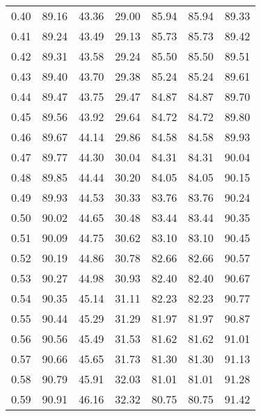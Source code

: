 \begin{tabular}{|c|c|c|c|c|c|c|}
      0.40 &     89.16 &     43.36 &      29.00 &   85.94 &      85.94 &         89.33 \\
      0.41 &     89.24 &     43.49 &      29.13 &   85.73 &      85.73 &         89.42 \\
      0.42 &     89.31 &     43.58 &      29.24 &   85.50 &      85.50 &         89.51 \\
      0.43 &     89.40 &     43.70 &      29.38 &   85.24 &      85.24 &         89.61 \\
      0.44 &     89.47 &     43.75 &      29.47 &   84.87 &      84.87 &         89.70 \\
      0.45 &     89.56 &     43.92 &      29.64 &   84.72 &      84.72 &         89.80 \\
      0.46 &     89.67 &     44.14 &      29.86 &   84.58 &      84.58 &         89.93 \\
      0.47 &     89.77 &     44.30 &      30.04 &   84.31 &      84.31 &         90.04 \\
      0.48 &     89.85 &     44.44 &      30.20 &   84.05 &      84.05 &         90.15 \\
      0.49 &     89.93 &     44.53 &      30.33 &   83.76 &      83.76 &         90.24 \\
      0.50 &     90.02 &     44.65 &      30.48 &   83.44 &      83.44 &         90.35 \\
      0.51 &     90.09 &     44.75 &      30.62 &   83.10 &      83.10 &         90.45 \\
      0.52 &     90.19 &     44.86 &      30.78 &   82.66 &      82.66 &         90.57 \\
      0.53 &     90.27 &     44.98 &      30.93 &   82.40 &      82.40 &         90.67 \\
      0.54 &     90.35 &     45.14 &      31.11 &   82.23 &      82.23 &         90.77 \\
      0.55 &     90.44 &     45.29 &      31.29 &   81.97 &      81.97 &         90.87 \\
      0.56 &     90.56 &     45.49 &      31.53 &   81.62 &      81.62 &         91.01 \\
      0.57 &     90.66 &     45.65 &      31.73 &   81.30 &      81.30 &         91.13 \\
      0.58 &     90.79 &     45.91 &      32.03 &   81.01 &      81.01 &         91.28 \\
      0.59 &     90.91 &     46.16 &      32.32 &   80.75 &      80.75 &         91.42 \\

\end{tabular}

